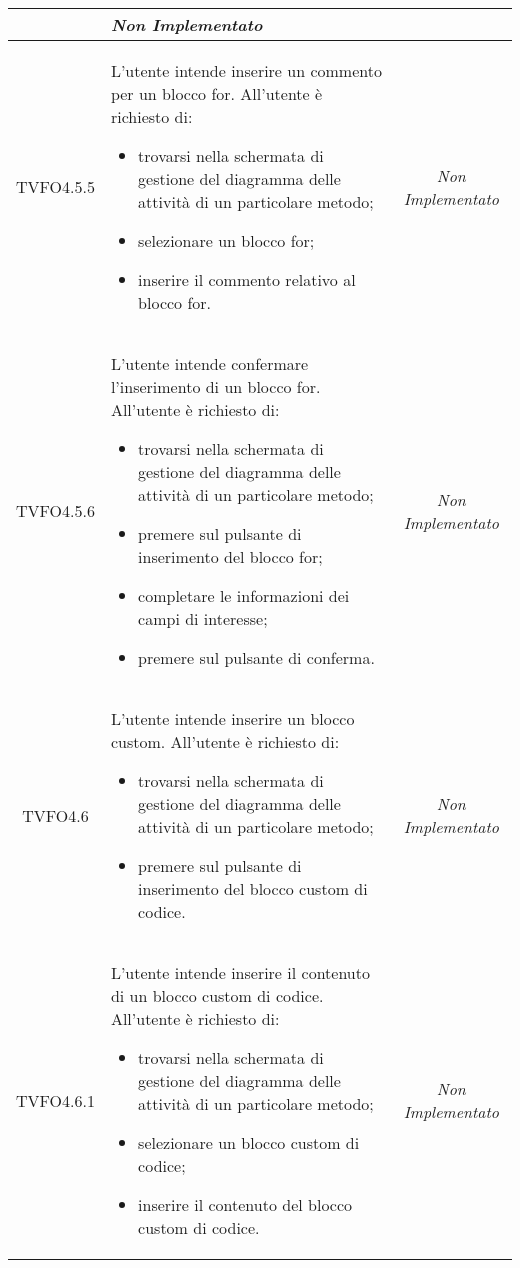 \begin{longtable}{|c|>{}m{8cm}|c|}
\begin{itemize}
\end{itemize} & \textit{Non Implementato}\\ \hline
\hypertarget{TVFO4.5.5}{TVFO4.5.5} & L'utente intende inserire un commento per un blocco for.
All'utente è richiesto di:
\begin{itemize}
\item trovarsi nella schermata di gestione del diagramma delle attività di un particolare metodo;
\item selezionare un blocco for;
\item inserire il commento relativo al blocco for.
\end{itemize} & \textit{Non Implementato}\\ \hline
\hypertarget{TVFO4.5.6}{TVFO4.5.6} & L'utente intende confermare l'inserimento di un blocco for.
All'utente è richiesto di:
\begin{itemize}
\item trovarsi nella schermata di gestione del diagramma delle attività di un particolare metodo;
\item premere sul pulsante di inserimento del blocco for;
\item completare le informazioni dei campi di interesse;
\item premere sul pulsante di conferma.
\end{itemize} & \textit{Non Implementato}\\ \hline
\hypertarget{TVFO4.6}{TVFO4.6} & L'utente intende inserire un blocco custom.
All'utente è richiesto di:
\begin{itemize}
\item trovarsi nella schermata di gestione del diagramma delle attività di un particolare metodo;
\item premere sul pulsante di inserimento del blocco custom di codice.
\end{itemize} & \textit{Non Implementato}\\ \hline
\hypertarget{TVFO4.6.1}{TVFO4.6.1} & L'utente intende inserire il contenuto di un blocco custom di codice.
All'utente è richiesto di:
\begin{itemize}
\item trovarsi nella schermata di gestione del diagramma delle attività di un particolare metodo;
\item selezionare un blocco custom di codice;
\item inserire il contenuto del blocco custom di codice.
\end{itemize} & \textit{Non Implementato}\\ \hline

\end{longtable}
